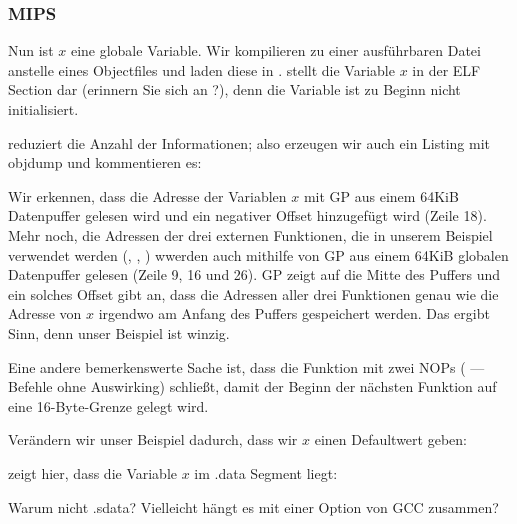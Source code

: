 \subsubsection{MIPS}

Nun ist $x$ eine globale Variable.
Wir kompilieren zu einer ausführbaren Datei anstelle eines Objectfiles und laden diese in \IDA.
\IDA stellt die Variable $x$ in der ELF Section  dar (erinnern Sie sich an ?), denn die Variable ist zu Beginn nicht initialisiert.


\IDA reduziert die Anzahl der Informationen; also erzeugen wir auch ein Listing mit objdump und kommentieren es:


Wir erkennen, dass die Adresse der Variablen $x$ mit GP aus einem 64KiB Datenpuffer gelesen wird und ein negativer
Offset hinzugefügt wird (Zeile 18). 
Mehr noch, die Adressen der drei externen Funktionen, die in unserem Beispiel verwendet werden (\puts, \scanf, \printf)
wwerden auch mithilfe von GP aus einem 64KiB globalen Datenpuffer gelesen (Zeile 9, 16 und 26).
GP zeigt auf die Mitte des Puffers und ein solches Offset gibt an, dass die Adressen aller drei Funktionen genau wie die
Adresse von $x$ irgendwo am Anfang des Puffers gespeichert werden. 
Das ergibt Sinn, denn unser Beispiel ist winzig.

Eine andere bemerkenswerte Sache ist, dass die Funktion mit zwei \ac{NOP}s ( --- Befehle ohne
Auswirking) schließt, damit der Beginn der nächsten Funktion auf eine 16-Byte-Grenze gelegt wird.


Verändern wir unser Beispiel dadurch, dass wir $x$ einen Defaultwert geben:



\IDA zeigt hier, dass die Variable $x$ im .data Segment liegt:


Warum nicht .sdata? Vielleicht hängt es mit einer Option von GCC zusammen?

